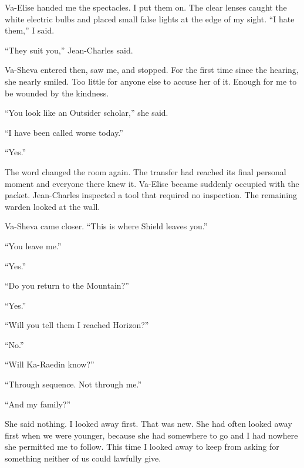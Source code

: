 Va-Elise handed me the spectacles. I put them on. The clear lenses caught the white electric bulbs and placed small false lights at the edge of my sight. ``I hate them,'' I said.\par

``They suit you,'' Jean-Charles said.\par

Va-Sheva entered then, saw me, and stopped. For the first time since the hearing, she nearly smiled. Too little for anyone else to accuse her of it. Enough for me to be wounded by the kindness.\par

``You look like an Outsider scholar,'' she said.\par

``I have been called worse today.''\par

``Yes.''\par

The word changed the room again. The transfer had reached its final personal moment and everyone there knew it. Va-Elise became suddenly occupied with the packet. Jean-Charles inspected a tool that required no inspection. The remaining warden looked at the wall.\par

Va-Sheva came closer. ``This is where Shield leaves you.''\par

``You leave me.''\par

``Yes.''\par

``Do you return to the Mountain?''\par

``Yes.''\par

``Will you tell them I reached Horizon?''\par

``No.''\par

``Will Ka-Raedin know?''\par

``Through sequence. Not through me.''\par

``And my family?''\par

She said nothing. I looked away first. That was new. She had often looked away first when we were younger, because she had somewhere to go and I had nowhere she permitted me to follow. This time I looked away to keep from asking for something neither of us could lawfully give.\par


